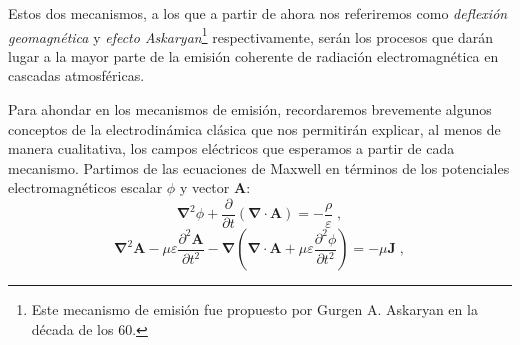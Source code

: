 \documentclass[11 pt, a4paper]{article} %
\numberwithin{equation}{section}
\numberwithin{figure}{section}
\numberwithin{table}{section}
\newcommand{\vect}[1]{\boldsymbol{\mathbf{#1}}}
\begin{document}
Estos dos mecanismos, a los que a partir de ahora nos referiremos como \textit{deflexión geomagnética} y \textit{efecto Askaryan}\footnote{ Este mecanismo de emisión fue propuesto por Gurgen A. Askaryan en la década de los 60.} respectivamente, serán los procesos que darán lugar a la mayor parte de la emisión coherente de radiación electromagnética en cascadas atmosféricas.

Para ahondar en los mecanismos de emisión, recordaremos brevemente algunos conceptos de la electrodinámica clásica que nos permitirán explicar, al menos de manera cualitativa, los campos eléctricos que esperamos a partir de cada mecanismo. Partimos de las ecuaciones de Maxwell en términos de los potenciales electromagnéticos escalar $\phi$ y vector $\vect{A}$:
	\begin{equation}
	\vect{\nabla}^2\phi+\frac{\partial}{\partial t}\left(\vect{\nabla}\cdot\vect{A}\right)=-\frac{\rho}{\varepsilon}\;,\label{ec31}
	\end{equation}
	\begin{equation}
	\vect{\nabla}^2\vect{A}-\mu\varepsilon\frac{\partial^2\vect{A}}{\partial t^2}-\vect{\nabla}\left(\vect{\nabla}\cdot\vect{A}+\mu\varepsilon\frac{\partial^2\phi}{\partial t^2}\right)=-\mu\vect{J}\;,\label{ec32}
	\end{equation}
\end{document}
